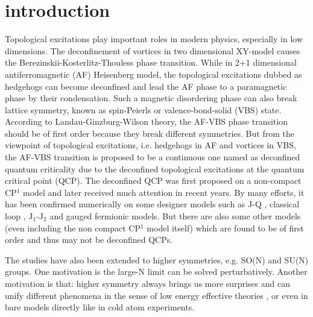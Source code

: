 \documentclass[twocolumn,superscriptaddress]{revtex4-1}
\begin{document}
\section{introduction}
Topological excitations play important roles in modern physics, especially in low dimensions. The deconfinement of vortices in two dimensional XY-model causes the Berezinskii-Kosterlitz-Thouless phase transition. \cite{Kosterlitz1973} While in 2+1 dimensional antiferromagnetic (AF) Heisenberg model, the topological excitations dubbed as hedgehogs can become deconfined and lead the AF phase to a paramagnetic phase by their condensation. \cite{Haldane1988a} Such a magnetic disordering phase can also break lattice symmetry, known as spin-Peierls or valence-bond-solid (VBS) state. \cite{Read1989b,*Read1989a,*Read1990} According to Landau-Ginzburg-Wilson theory, the AF-VBS phase transition should be of first order because they break different symmetries. But from the viewpoint of topological excitations, i.e. hedgehogs in AF and vortices in VBS, the AF-VBS transition is proposed to be a continuous one named as deconfined quantum criticality due to the deconfined topological excitations at the quantum critical point (QCP). \cite{Senthil2004,*Senthil2004a,*Levin2004} The deconfined QCP was first proposed on a non-compact CP$^1$ model and later received much attention in recent years. By many efforts, it has been confirmed numerically on some designer models such as J-Q \cite{Sandvik2007,Melko2008,Sandvik2010,Pujari2013,Shao2016}, classical loop \cite{Nahum2015}, J$_1$-J$_2$ \cite{Wang2016d} and gauged fermionic \cite{Assaad2016} models. But there are also some other models \cite{Kragset2006,Kuklov2006,Sen2010,Papanikolaou2010} (even including the non compact CP$^1$ model itself\cite{Kuklov2008}) which are found to be of first order and thus may not be deconfined QCPs. 

The studies have also been extended to higher symmetries, e.g. SO(N)\cite{Kaul2015} and SU(N)
groups\cite{Lou2009,Kaul2012a,Kaul2012,Block2013,D'Emidio2016,D'Emidio2017}. One motivation is the large-N limit can be solved perturbatively. \cite{Affleck1988a,Marston1989,Arovas1988,Read1989b,*Read1989a,*Read1990,Auerbach2011} Another motivation is that: higher symmetry always brings us more surprises and can unify different phenomena in the sense of low energy effective theories \cite{Hooft2005,Zhang1997,Volovik2003,Hayward2014,Nahum2015a}, or even in bare models directly like in cold atom experiments. \cite{Wu2003,*Wu2006a,DeSalvo2010,Taie2010,Krauser2012,Taie2012,Zhang2014,Cazalilla2014,Laflamme2016} 
\end{document}
